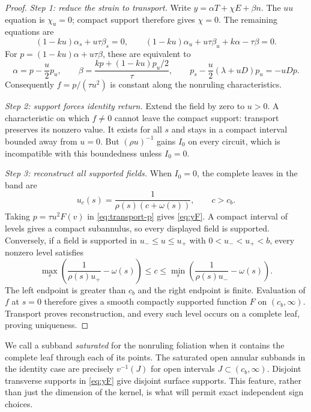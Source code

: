 \documentclass[11pt]{amsart}
\theoremstyle{definition}
\theoremstyle{remark}
\numberwithin{equation}{section}
\begin{document}
\begin{proof}
\emph{Step 1: reduce the strain to transport.}
Write $y=\alpha T+\chi E+\beta n$. The $uu$ equation is $\chi_u=0$;
compact support therefore gives $\chi=0$. The remaining equations are
\[
 (1-ku)\alpha_s+u\tau\beta_s=0,\qquad
 (1-ku)\alpha_u+u\tau\beta_u+k\alpha-\tau\beta=0.
\]
For $p=(1-ku)\alpha+u\tau\beta$, these are equivalent to
\begin{equation}\label{eq:transport-p}
 \alpha=p-\frac u2p_u,\qquad
 \beta=\frac{kp+(1-ku)p_u/2}{\tau},\qquad
 p_s-\frac u2(\lambda+uD)p_u=-uDp.
\end{equation}
Consequently $f=p/(\tau u^2)$ is constant along the nonruling
characteristics.

\emph{Step 2: support forces identity return.}
Extend the field by zero to $u>0$. A characteristic on which $f\ne0$
cannot leave the compact support: transport preserves its nonzero value.
It exists for all $s$ and stays in a compact interval bounded away from
$u=0$. But $(\rho u)^{-1}$ gains $I_0$ on every circuit, which is
incompatible with this boundedness unless $I_0=0$.

\emph{Step 3: reconstruct all supported fields.}
When $I_0=0$, the complete leaves in the band are
\begin{equation}\label{eq:closed-leaves}
 u_c(s)=\frac1{\rho(s)(c+\omega(s))},\qquad c>c_b.
\end{equation}
Taking $p=\tau u^2F(v)$ in \eqref{eq:transport-p} gives \eqref{eq:yF}.
A compact interval of levels gives a compact subannulus, so every displayed
field is supported. Conversely, if a field is supported in
$u_-\le u\le u_+$ with $0<u_-<u_+<b$, every nonzero level satisfies
\[
 \max_s\left(\frac1{\rho(s)u_+}-\omega(s)\right)
 \le c\le
 \min_s\left(\frac1{\rho(s)u_-}-\omega(s)\right).
\]
The left endpoint is greater than $c_b$ and the right endpoint is finite.
Evaluation of $f$ at $s=0$ therefore gives a smooth compactly supported
function $F$ on $(c_b,\infty)$. Transport proves reconstruction, and every
such level occurs on a complete leaf, proving uniqueness.
\end{proof}
We call a subband \emph{saturated} for the nonruling foliation when it
contains the complete leaf through each of its points. The saturated
open annular subbands in the identity case are precisely $v^{-1}(J)$ for open intervals
$J\subset(c_b,\infty)$.
Disjoint transverse supports in \eqref{eq:yF} give disjoint surface
supports. This feature, rather than just the dimension of the kernel,
is what will permit exact independent sign choices.
\end{document}
